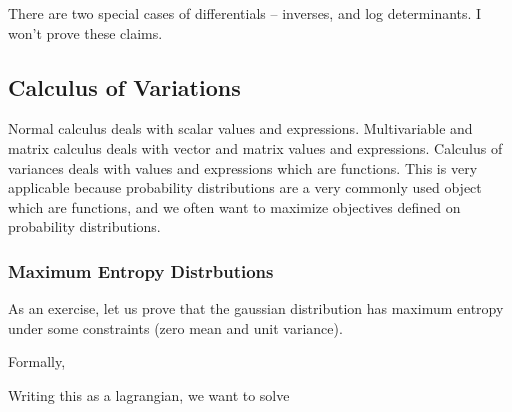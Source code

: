 \documentclass[12pt]{article}
\begin{document}
There are two special cases of differentials -- inverses, and log determinants. I won't prove these claims.


\subsection{Calculus of Variations}

Normal calculus deals with scalar values and expressions. Multivariable and matrix calculus deals with vector and matrix values and expressions. Calculus of variances deals with values and expressions which are functions. This is very applicable because probability distributions are a very commonly used object which are functions, and we often want to maximize objectives defined on probability distributions.


\subsubsection{Maximum Entropy Distrbutions}

As an exercise, let us prove that the gaussian distribution has maximum entropy under some constraints (zero mean and unit variance). 

Formally, 

Writing this as a lagrangian, we want to solve
\end{document}
